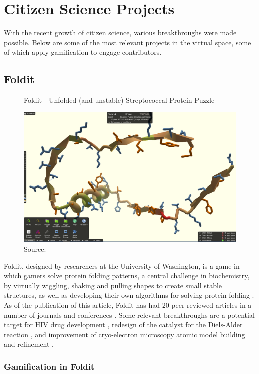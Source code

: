 \section{Citizen Science Projects}

With the recent growth of citizen science, various breakthroughs were made possible. Below are some of the most relevant projects in the virtual space, some of which apply gamification to engage contributors.

\subsection{Foldit}

\begin{figure}[ht]
    \centering
    \caption{Foldit - Unfolded (and unstable) Streptococcal Protein Puzzle}
    \includegraphics[width=0.8\linewidth]{images/background/foldit-problem.png}
    \caption*{Source: \cite{foldit-protein-problem}}
    \label{fig:foldit-problem}
\end{figure}

Foldit, designed by researchers at the University of Washington, is a game in which gamers solve protein folding patterns, a central challenge in biochemistry, by virtually wiggling, shaking and pulling shapes to create small stable structures, as well as developing their own algorithms for solving protein folding \cite{bourzac2008enlisting}. As of the publication of this article, Foldit has had 20 peer-reviewed articles in a number of journals and conferences \cite{foldit2021publications}. Some relevant breakthroughs are a potential target for HIV drug development \cite{khatib2011crystal}, redesign of the catalyst for the Diels-Alder reaction \cite{eiben2012increased}, and improvement of cryo-electron microscopy atomic model building and refinement \cite{khatib2019building}.

\subsubsection*{Gamification in Foldit}

